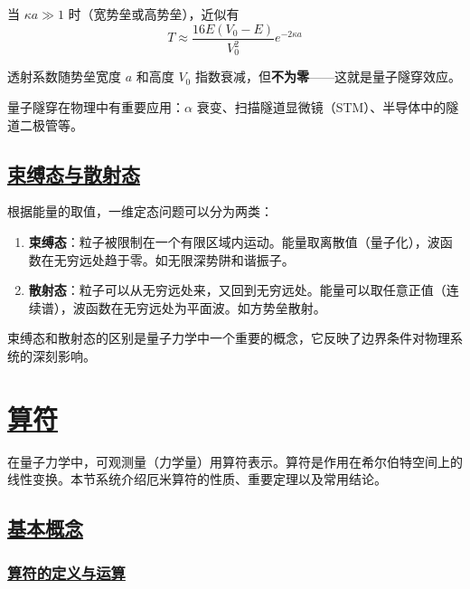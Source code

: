 当 $\kappa a \gg 1$ 时（宽势垒或高势垒），近似有
\begin{equation}
    T \approx \frac{16E(V_0-E)}{V_0^2}e^{-2\kappa a}
\end{equation}

透射系数随势垒宽度 $a$ 和高度 $V_0$ 指数衰减，但\textbf{不为零}——这就是量子隧穿效应。

\begin{remark}
    量子隧穿在物理中有重要应用：$\alpha$ 衰变、扫描隧道显微镜（STM）、半导体中的隧道二极管等。
\end{remark}

\subsection{\protect\hyperlink{:}{束缚态与散射态}}

根据能量的取值，一维定态问题可以分为两类：

\begin{enumerate}
    \item \textbf{束缚态}：粒子被限制在一个有限区域内运动。能量取离散值（量子化），波函数在无穷远处趋于零。如无限深势阱和谐振子。
    \item \textbf{散射态}：粒子可以从无穷远处来，又回到无穷远处。能量可以取任意正值（连续谱），波函数在无穷远处为平面波。如方势垒散射。
\end{enumerate}

束缚态和散射态的区别是量子力学中一个重要的概念，它反映了边界条件对物理系统的深刻影响。



\section{\protect\hyperlink{:}{算符}}

在量子力学中，可观测量（力学量）用算符表示。算符是作用在希尔伯特空间上的线性变换。本节系统介绍厄米算符的性质、重要定理以及常用结论。

\subsection{\protect\hyperlink{:}{基本概念}}

\subsubsection{\protect\hyperlink{:}{算符的定义与运算}}

